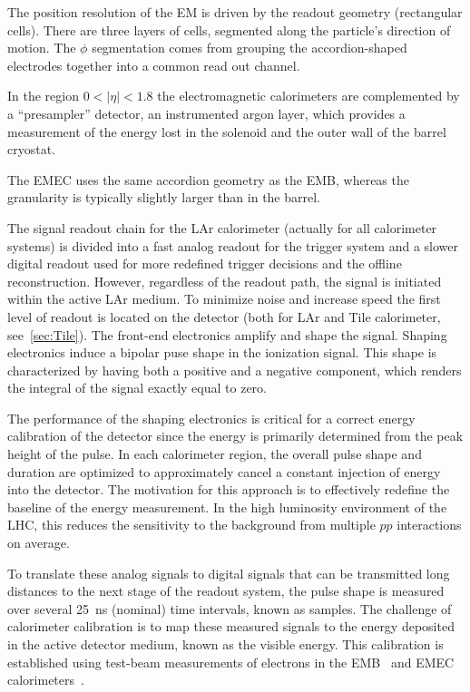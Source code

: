 The position resolution of the EM is driven by the readout geometry (rectangular cells). There are three layers of cells, segmented along the particle's direction of motion.  The $\phi$ segmentation comes from grouping the accordion-shaped electrodes together into a common read out channel. 

In the region $0 <|\eta| < 1.8$ the electromagnetic calorimeters are complemented by a ``presampler'' detector, an instrumented argon layer, which provides a measurement of the energy lost in the solenoid and the outer wall of the barrel cryostat.

The EMEC uses the same accordion geometry as the EMB, whereas the granularity is typically slightly larger than in the barrel.

The signal readout chain for the LAr calorimeter (actually for all calorimeter systems) is divided into a fast analog readout for the trigger system and a slower digital readout used for more redefined trigger decisions and the offline reconstruction. However, regardless of the readout path, the signal is initiated within the active LAr medium. To minimize noise and increase speed the first level of readout is located on the detector (both for LAr and Tile calorimeter, see~\ref{sec:Tile}). The front-end electronics amplify and shape the signal. Shaping electronics induce a bipolar puse shape in the ionization signal. This shape is characterized by having both a positive and a negative component, which renders the integral of the signal exactly equal to zero.

The performance of the shaping electronics is critical for a correct energy calibration of the detector since the energy is primarily determined from the peak height of the pulse. %
In each calorimeter region, the overall pulse shape and duration are optimized to approximately cancel a constant injection of energy into the detector. The motivation for this approach is to effectively redefine the baseline of the energy measurement. In the high luminosity environment of the LHC, this reduces the sensitivity to the background from multiple $pp$ interactions on average.

To translate these analog signals to digital signals that can be transmitted long distances to the next stage of the readout system, the pulse shape is measured over several 25~ns (nominal) time intervals, known as samples. The challenge of calorimeter calibration is to map these measured signals to the energy deposited in the active detector medium, known as the visible energy. This calibration is established using test-beam measurements of electrons in the EMB~\cite{1748-0221-5-11-P11006,Aharrouche2010400,Aharrouche2007429,Aharrouche2006601} %
and EMEC calorimeters~\cite{Cojocaru2004481,Pinfold2008324}. %


